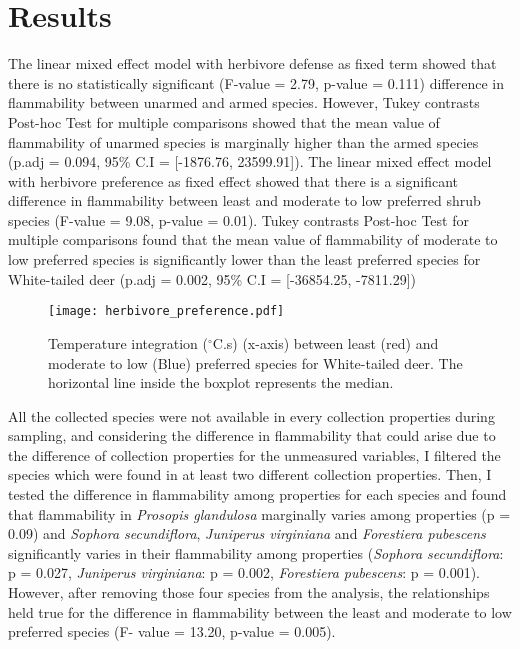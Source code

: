 \documentclass[12pt]{report}
\begin{document}
\section{Results}

The linear mixed effect model with herbivore defense as fixed term showed that there is no statistically significant (F-value = 2.79, p-value = 0.111) difference in flammability between unarmed and armed species. However, Tukey contrasts Post-hoc Test for multiple comparisons showed that the mean value of flammability of unarmed species is marginally higher than the armed species (p.adj = 0.094, 95\% C.I = [-1876.76, 23599.91]). The linear mixed effect model with herbivore preference as fixed effect showed that there is a significant difference in flammability between least and moderate to low preferred shrub species (F-value = 9.08, p-value = 0.01). Tukey contrasts Post-hoc Test for multiple comparisons found that the mean value of flammability of moderate to low  preferred species is significantly lower than the least preferred species for White-tailed deer (p.adj = 0.002, 95\% C.I = [-36854.25, -7811.29])\\


\begin{figure}
    \centering
    \texttt{[image: herbivore\_preference.pdf]}
    \caption{Temperature integration ($^{\circ}$C.s) (x-axis) between least (red) and moderate to low (Blue) preferred species for White-tailed deer. The horizontal line inside the boxplot represents the median.}   
\end{figure}

All the collected species were not available in every collection properties during sampling, and considering the difference in flammability that could arise due to the difference of collection properties for the unmeasured variables, I filtered the species which were found in at least two different collection properties. Then, I tested the difference in flammability among properties for each species and found that flammability in \emph{Prosopis glandulosa} marginally varies among properties (p = 0.09) and \emph{Sophora secundiflora}, \emph{Juniperus virginiana} and \emph{Forestiera pubescens} significantly varies in their flammability among properties (\emph{Sophora secundiflora}: p = 0.027, \emph{Juniperus virginiana}: p = 0.002, \emph{Forestiera pubescens}: p = 0.001). However, after removing those four species from the analysis, the relationships held true for the difference in flammability between the least and moderate to low preferred species (F- value = 13.20, p-value = 0.005).
\end{document}
